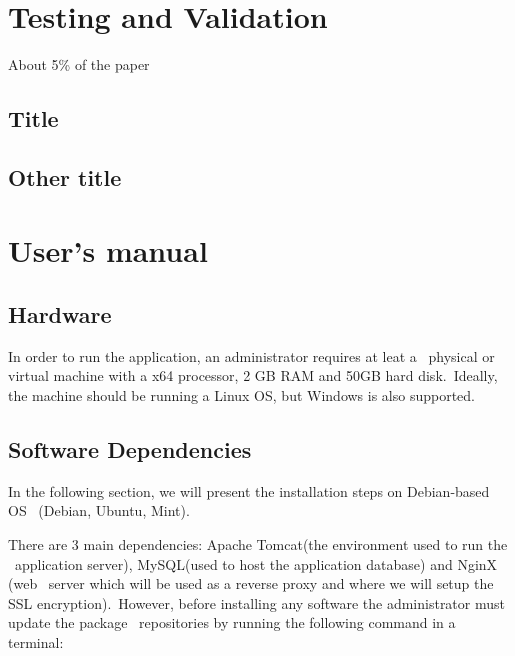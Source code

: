 \documentclass[12pt,a4paper,twoside]{report}
\begin{document}
\chapter{Testing and Validation}

About 5\% of the paper
\section{Title}
\section{Other title}

\chapter{User's manual}

\section{Hardware}
In order to run the application, an administrator requires at leat a \
physical or virtual machine with a x64 processor, 2 GB RAM and 50GB hard disk.\
Ideally, the machine should be running a Linux OS, but Windows is also supported.

\section{Software Dependencies}
In the following section, we will present the installation steps on Debian-based OS \
(Debian, Ubuntu, Mint).

There are 3 main dependencies: Apache Tomcat(the environment used to run the \
application server), MySQL(used to host the application database) and NginX (web \
server which will be used as a reverse proxy and where we will setup the SSL encryption).\
However, before installing any software the administrator must update the package \
repositories by running the following command in a terminal:
\end{document}
